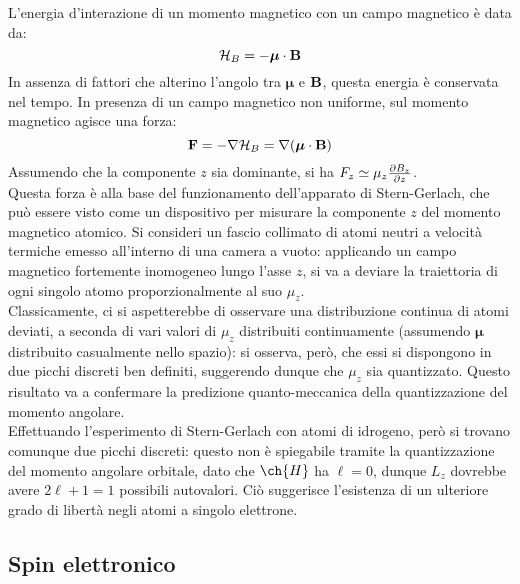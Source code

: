 L'energia d'interazione di un momento magnetico con un campo magnetico è data da:
\begin{equation}
	\mathcal{H}_B = - \boldsymbol{\mu} \cdot \mathbf{B}
	\label{eq:ham-mag-int}
\end{equation}
In assenza di fattori che alterino l'angolo tra $ \boldsymbol{\mu} $ e $ \mathbf{B} $, questa energia è conservata nel tempo. In presenza di un campo magnetico non uniforme, sul momento magnetico agisce una forza:
\begin{equation}
	\mathbf{F} = - \nabla \mathcal{H}_B = \nabla (\boldsymbol{\mu} \cdot \mathbf{B})
	\label{eq:stern-gerlach}
\end{equation}
Assumendo che la componente $ z $ sia dominante, si ha $ F_z \simeq \mu_z \frac{\partial B_z}{\partial z} $.\\
Questa forza è alla base del funzionamento dell'apparato di Stern-Gerlach, che può essere visto come un dispositivo per misurare la componente $ z $ del momento magnetico atomico. Si consideri un fascio collimato di atomi neutri a velocità termiche emesso all'interno di una camera a vuoto: applicando un campo magnetico fortemente inomogeneo lungo l'asse $ z $, si va a deviare la traiettoria di ogni singolo atomo proporzionalmente al suo $ \mu_z $.\\
Classicamente, ci si aspetterebbe di osservare una distribuzione continua di atomi deviati, a seconda di vari valori di $ \mu_z $ distribuiti continuamente (assumendo $ \boldsymbol{\mu} $ distribuito casualmente nello spazio): si osserva, però, che essi si dispongono in due picchi discreti ben definiti, suggerendo dunque che $ \mu_z $ sia quantizzato. Questo risultato va a confermare la predizione quanto-meccanica della quantizzazione del momento angolare.\\
Effettuando l'esperimento di Stern-Gerlach con atomi di idrogeno, però si trovano comunque due picchi discreti: questo non è spiegabile tramite la quantizzazione del momento angolare orbitale, dato che $ \ch{H} $ ha $ \ell = 0 $, dunque $ L_z $ dovrebbe avere $ 2\ell + 1 = 1 $ possibili autovalori. Ciò suggerisce l'esistenza di un ulteriore grado di libertà negli atomi a singolo elettrone.

\subsection{Spin elettronico}

